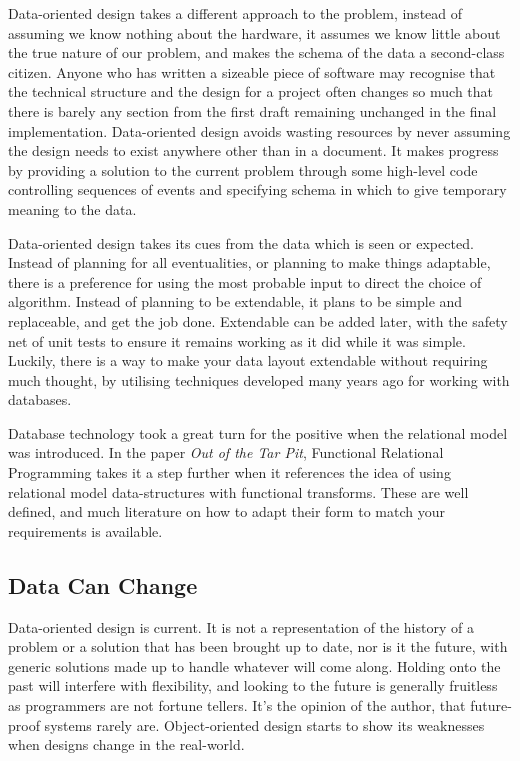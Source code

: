 \documentclass[a4paper,12pt]{book}
\begin{document}
Data-oriented design takes a different approach to the problem, instead of assuming we know nothing about the hardware, it assumes we know little about the true nature of our problem, and makes the schema of the data a second-class citizen.
Anyone who has written a sizeable piece of software may recognise that the technical structure and the design for a project often changes so much that there is barely any section from the first draft remaining unchanged in the final implementation.
Data-oriented design avoids wasting resources by never assuming the design needs to exist anywhere other than in a document.
It makes progress by providing a solution to the current problem through some high-level code controlling sequences of events and specifying schema in which to give temporary meaning to the data.

Data-oriented design takes its cues from the data which is seen or expected.
Instead of planning for all eventualities, or planning to make things adaptable, there is a preference for using the most probable input to direct the choice of algorithm.
Instead of planning to be extendable, it plans to be simple and replaceable, and get the job done.
Extendable can be added later, with the safety net of unit tests to ensure it remains working as it did while it was simple.
Luckily, there is a way to make your data layout extendable without requiring much thought, by utilising techniques developed many years ago for working with databases.

Database technology took a great turn for the positive when the relational model was introduced.
In the paper \textit{Out of the Tar Pit}, Functional Relational Programming takes it a step further when it references the idea of using relational model data-structures with functional transforms.
These are well defined, and much literature on how to adapt their form to match your requirements is available.

\subsection{Data Can Change}

Data-oriented design is current.
It is not a representation of the history of a problem or a solution that has been brought up to date, nor is it the future, with generic solutions made up to handle whatever will come along.
Holding onto the past will interfere with flexibility, and looking to the future is generally fruitless as programmers are not fortune tellers.
It's the opinion of the author, that future-proof systems rarely are.
Object-oriented design starts to show its weaknesses when designs change in the real-world.
\end{document}
